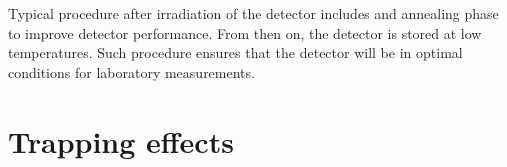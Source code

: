 Typical procedure after irradiation of the detector includes and annealing phase to improve detector performance. From then on, the detector is stored at low temperatures. Such procedure ensures that the detector will be in optimal conditions for laboratory measurements.


\section{Trapping effects} %



